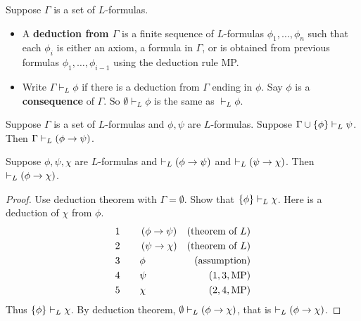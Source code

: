 \pagebreak


\begin{definition}
Suppose $ \Gamma $ is a set of $ L $-formulas.
\begin{itemize}
\item A \textbf{deduction from $ \Gamma $} is a finite sequence of $ L $-formulas $ \phi_1, \dots, \phi_n $ such that each $ \phi_i $ is either an axiom, a formula in $ \Gamma $, or is obtained from previous formulas $ \phi_1, \dots, \phi_{i - 1} $ using the deduction rule MP.
\item Write $ \Gamma \vdash_L \phi $ if there is a deduction from $ \Gamma $ ending in $ \phi $. Say $ \phi $ is a \textbf{consequence} of $ \Gamma $. So $ \emptyset \vdash_L \phi $ is the same as $ \vdash_L \phi $.
\end{itemize}
\end{definition}

\begin{theorem}
\label{thm:1.2.5}
Suppose $ \Gamma $ is a set of $ L $-formulas and $ \phi, \psi $ are $ L $-formulas. Suppose $ \Gamma \cup \cbr{\phi} \vdash_L \psi $. Then $ \Gamma \vdash_L \impb{\phi}{\psi} $.
\end{theorem}

\begin{corollary}
Suppose $ \phi, \psi, \chi $ are $ L $-formulas and $ \vdash_L \impb{\phi}{\psi} $ and $ \vdash_L \impb{\psi}{\chi} $. Then $ \vdash_L \impb{\phi}{\chi} $.
\end{corollary}

\begin{proof}
Use deduction theorem with $ \Gamma = \emptyset $. Show that $ \cbr{\phi} \vdash_L \chi $. Here is a deduction of $ \chi $ from $ \phi $.
\begin{align*}
1 \qquad & \impb{\phi}{\psi} & \br{\text{theorem of} \ L} \\
2 \qquad & \impb{\psi}{\chi} & \br{\text{theorem of} \ L} \\
3 \qquad & \phi & \br{\text{assumption}} \\
4 \qquad & \psi & \br{1, 3, \text{MP}} \\
5 \qquad & \chi & \br{2, 4, \text{MP}}
\end{align*}
Thus $ \cbr{\phi} \vdash_L \chi $. By deduction theorem, $ \emptyset \vdash_L \impb{\phi}{\chi} $, that is $ \vdash_L \impb{\phi}{\chi} $.
\end{proof}

